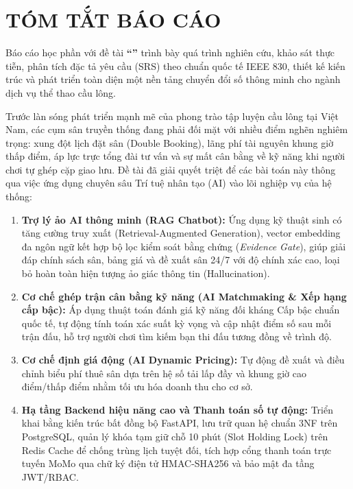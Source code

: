 
\chapter*{TÓM TẮT BÁO CÁO}

Báo cáo học phần \textbf{\course} với đề tài \textbf{``\reporttitle''} trình bày quá trình nghiên cứu, khảo sát thực tiễn, phân tích đặc tả yêu cầu (SRS) theo chuẩn quốc tế IEEE 830, thiết kế kiến trúc và phát triển toàn diện một nền tảng chuyển đổi số thông minh cho ngành dịch vụ thể thao cầu lông.

Trước làn sóng phát triển mạnh mẽ của phong trào tập luyện cầu lông tại Việt Nam, các cụm sân truyền thống đang phải đối mặt với nhiều điểm nghẽn nghiêm trọng: xung đột lịch đặt sân (Double Booking), lãng phí tài nguyên khung giờ thấp điểm, áp lực trực tổng đài tư vấn và sự mất cân bằng về kỹ năng khi người chơi tự ghép cặp giao lưu. Đề tài đã giải quyết triệt để các bài toán này thông qua việc ứng dụng chuyên sâu Trí tuệ nhân tạo (AI) vào lõi nghiệp vụ của hệ thống:
\begin{enumerate}[label=\arabic*)]
    \item \textbf{Trợ lý ảo AI thông minh (RAG Chatbot):} Ứng dụng kỹ thuật sinh có tăng cường truy xuất (Retrieval-Augmented Generation), vector embedding đa ngôn ngữ kết hợp bộ lọc kiểm soát bằng chứng (\textit{Evidence Gate}), giúp giải đáp chính sách sân, bảng giá và đề xuất sân 24/7 với độ chính xác cao, loại bỏ hoàn toàn hiện tượng ảo giác thông tin (Hallucination).
    \item \textbf{Cơ chế ghép trận cân bằng kỹ năng (AI Matchmaking \& Xếp hạng cấp bậc):} Áp dụng thuật toán đánh giá kỹ năng đối kháng Cấp bậc chuẩn quốc tế, tự động tính toán xác suất kỳ vọng và cập nhật điểm số sau mỗi trận đấu, hỗ trợ người chơi tìm kiếm bạn thi đấu tương đồng về trình độ.
    \item \textbf{Cơ chế định giá động (AI Dynamic Pricing):} Tự động đề xuất và điều chỉnh biểu phí thuê sân dựa trên hệ số tải lấp đầy và khung giờ cao điểm/thấp điểm nhằm tối ưu hóa doanh thu cho cơ sở.
    \item \textbf{Hạ tầng Backend hiệu năng cao và Thanh toán số tự động:} Triển khai bằng kiến trúc bất đồng bộ FastAPI, lưu trữ quan hệ chuẩn 3NF trên PostgreSQL, quản lý khóa tạm giữ chỗ 10 phút (Slot Holding Lock) trên Redis Cache để chống trùng lịch tuyệt đối, tích hợp cổng thanh toán trực tuyến MoMo qua chữ ký điện tử HMAC-SHA256 và bảo mật đa tầng JWT/RBAC.
\end{enumerate}

